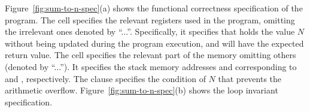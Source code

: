 Figure~\ref{fig:sum-to-n-spec}(a) shows the functional correctness specification of the  program.
The  cell specifies the relevant registers used in the program, omitting the irrelevant ones denoted by ``...''.
Specifically, it specifies that  holds the value $N$ without being updated during the program execution, and  will have the expected return value.
The  cell specifies the relevant part of the memory omitting others (denoted by ``...'').
It specifies the stack memory addresses  and  corresponding to  and , respectively.
The  clause specifies the condition of $N$ that prevents the arithmetic overflow.
%
Figure~\ref{fig:sum-to-n-spec}(b) shows the loop invariant specification.
